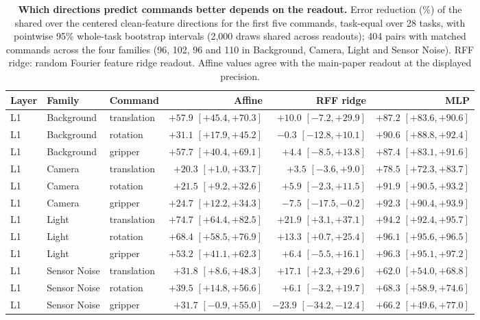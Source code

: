 \begin{table}[t]\centering\footnotesize
\caption{\textbf{Which directions predict commands better depends on the readout.} Error reduction (\%) of the shared over the centered clean-feature directions for the first five commands, task-equal over 28 tasks, with pointwise 95\% whole-task bootstrap intervals (2{,}000 draws shared across readouts); 404 pairs with matched commands across the four families (96, 102, 96 and 110 in Background, Camera, Light and Sensor Noise). RFF ridge: random Fourier feature ridge readout. Affine values agree with the main-paper readout at the displayed precision.}
\label{tab:readout-capacity-full}
\setlength{\tabcolsep}{3.4pt}
\begin{tabular}{@{}lllrrr@{}}\toprule
Layer & Family & Command & Affine & RFF ridge & MLP\\\midrule
L1 & Background & translation & $+57.9$ $[+45.4,+70.3]$ & $+10.0$ $[-7.2,+29.9]$ & $+87.2$ $[+83.6,+90.6]$\\
L1 & Background & rotation & $+31.1$ $[+17.9,+45.2]$ & $-0.3$ $[-12.8,+10.1]$ & $+90.6$ $[+88.8,+92.4]$\\
L1 & Background & gripper & $+57.7$ $[+40.4,+69.1]$ & $+4.4$ $[-8.5,+13.8]$ & $+87.4$ $[+83.1,+91.6]$\\
L1 & Camera & translation & $+20.3$ $[+1.0,+33.7]$ & $+3.5$ $[-3.6,+9.0]$ & $+78.5$ $[+72.3,+83.7]$\\
L1 & Camera & rotation & $+21.5$ $[+9.2,+32.6]$ & $+5.9$ $[-2.3,+11.5]$ & $+91.9$ $[+90.5,+93.2]$\\
L1 & Camera & gripper & $+24.7$ $[+12.2,+34.3]$ & $-7.5$ $[-17.5,-0.2]$ & $+92.3$ $[+90.4,+93.9]$\\
L1 & Light & translation & $+74.7$ $[+64.4,+82.5]$ & $+21.9$ $[+3.1,+37.1]$ & $+94.2$ $[+92.4,+95.7]$\\
L1 & Light & rotation & $+68.4$ $[+58.5,+76.9]$ & $+13.3$ $[+0.7,+25.4]$ & $+96.1$ $[+95.6,+96.5]$\\
L1 & Light & gripper & $+53.2$ $[+41.1,+62.3]$ & $+6.4$ $[-5.5,+16.1]$ & $+96.3$ $[+95.1,+97.2]$\\
L1 & Sensor Noise & translation & $+31.8$ $[+8.6,+48.3]$ & $+17.1$ $[+2.3,+29.6]$ & $+62.0$ $[+54.0,+68.8]$\\
L1 & Sensor Noise & rotation & $+39.5$ $[+14.8,+56.6]$ & $+6.1$ $[-3.2,+19.7]$ & $+68.3$ $[+58.9,+74.6]$\\
L1 & Sensor Noise & gripper & $+31.7$ $[-0.9,+55.0]$ & $-23.9$ $[-34.2,-12.4]$ & $+66.2$ $[+49.6,+77.0]$\\

\end{tabular}
\end{table}
